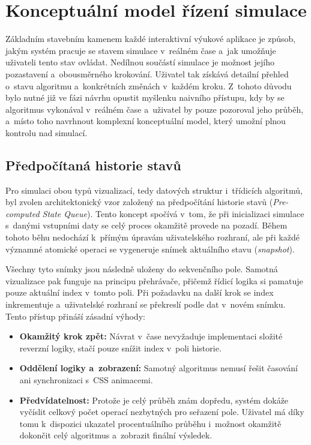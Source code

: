 
\section{Konceptuální model řízení simulace}
\label{sec:simulation-control-model}

Základním stavebním kamenem každé interaktivní výukové aplikace je způsob, jakým systém pracuje se stavem simulace v~reálném čase a~jak umožňuje uživateli tento stav ovládat.
Nedílnou součástí simulace je možnost jejího pozastavení a~obousměrného krokování.
Uživatel tak získává detailní přehled o~stavu algoritmu a~konkrétních změnách v~každém kroku.
Z~tohoto důvodu bylo nutné již ve fázi návrhu opustit myšlenku naivního přístupu, kdy by se algoritmus vykonával v~reálném čase a~uživatel by pouze pozoroval jeho průběh, a~místo toho navrhnout komplexní konceptuální model, který umožní plnou kontrolu nad simulací.

\subsection{Předpočítaná historie stavů}
\label{subsec:precomputed-state-history}

Pro simulaci obou typů vizualizací, tedy datových struktur i~třídicích algoritmů, byl zvolen architektonický vzor založený na předpočítání historie stavů (\textit{Pre-computed State Queue}).
Tento koncept spočívá v~tom, že při inicializaci simulace s~danými vstupními daty se celý proces okamžitě provede na pozadí.
Během tohoto běhu nedochází k~přímým úpravám uživatelského rozhraní, ale při každé významné atomické operaci se vygeneruje snímek aktuálního stavu (\textit{snapshot}).

Všechny tyto snímky jsou následně uloženy do sekvenčního pole.
Samotná vizualizace pak funguje na principu přehrávače, přičemž řídicí logika si pamatuje pouze aktuální index v~tomto poli.
Při požadavku na další krok se index inkrementuje a~uživatelské rozhraní se překreslí podle dat v~novém snímku.
Tento přístup přináší zásadní výhody:
\begin{itemize}
    \item \textbf{Okamžitý krok zpět:} Návrat v~čase nevyžaduje implementaci složité reverzní logiky, stačí pouze snížit index v~poli historie.
    \item \textbf{Oddělení logiky a~zobrazení:} Samotný algoritmus nemusí řešit časování ani synchronizaci s~CSS animacemi.
    \item \textbf{Předvídatelnost:} Protože je celý průběh znám dopředu, systém dokáže vyčíslit celkový počet operací nezbytných pro seřazení pole. Uživatel má díky tomu k~dispozici ukazatel procentuálního průběhu i~možnost okamžitě dokončit celý algoritmus a~zobrazit finální výsledek.
\end{itemize}

